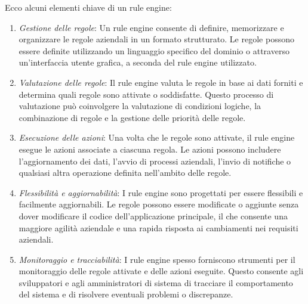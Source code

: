 Ecco alcuni elementi chiave di un rule engine:

\begin{enumerate}[label=\alph*.]
    \item \textit{Gestione delle regole}: Un rule engine consente di definire, memorizzare e organizzare le regole aziendali in un formato strutturato. Le regole possono essere definite utilizzando un linguaggio specifico del dominio o attraverso un'interfaccia utente grafica, a seconda del rule engine utilizzato.

    \item \textit{Valutazione delle regole}: Il rule engine valuta le regole in base ai dati forniti e determina quali regole sono attivate o soddisfatte. Questo processo di valutazione può coinvolgere la valutazione di condizioni logiche, la combinazione di regole e la gestione delle priorità delle regole.

    \item \textit{Esecuzione delle azioni}: Una volta che le regole sono attivate, il rule engine esegue le azioni associate a ciascuna regola. Le azioni possono includere l'aggiornamento dei dati, l'avvio di processi aziendali, l'invio di notifiche o qualsiasi altra operazione definita nell'ambito delle regole.
    
    
    \item \textit{Flessibilità e aggiornabilità}: I rule engine sono progettati per essere flessibili e facilmente aggiornabili. Le regole possono essere modificate o aggiunte senza dover modificare il codice dell'applicazione principale, il che consente una maggiore agilità aziendale e una rapida risposta ai cambiamenti nei requisiti aziendali.

    \item \textit{Monitoraggio e tracciabilità}: I rule engine spesso forniscono strumenti per il monitoraggio delle regole attivate e delle azioni eseguite. Questo consente agli sviluppatori e agli amministratori di sistema di tracciare il comportamento del sistema e di risolvere eventuali problemi o discrepanze.
\end{enumerate}


